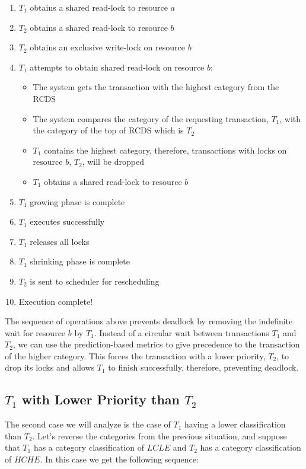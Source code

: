 \begin{enumerate}
  \item $T_{1}$ obtains a shared read-lock to resource $a$
  \item $T_{2}$ obtains a shared read-lock to resource $b$
  \item $T_{2}$ obtains an exclusive write-lock on resource $b$
  \item $T_{1}$ attempts to obtain shared read-lock on resource $b$:
    \begin{itemize}
        \item The system gets the transaction with the highest category from the RCDS
        \item The system compares the category of the requesting transaction, $T_{1}$, with the category of the top of RCDS which is $T_{2}$
        \item $T_{1}$ contains the highest category, therefore, transactions with locks on resource $b$, $T_{2}$, will be dropped
        \item $T_{1}$ obtains a shared read-lock to resource $b$
    \end{itemize}
  \item $T_{1}$ growing phase is complete
  \item $T_{1}$ executes successfully
  \item $T_{1}$ releases all locks
  \item $T_{1}$ shrinking phase is complete
  \item $T_{2}$ is sent to scheduler for rescheduling
  \item Execution complete!
\end{enumerate}

The sequence of operations above prevents deadlock by removing the indefinite wait for resource $b$ by $T_{1}$. Instead of a circular wait between transactions $T_{1}$ and $T_{2}$, we can use the prediction-based metrics to give precedence to the transaction of the higher category. This forces the transaction with a lower priority, $T_{2}$, to drop its locks and allows $T_{1}$ to finish successfully, therefore, preventing deadlock.

\subsection{\texorpdfstring{$T_{1}$ with Lower Priority than $T_{2}$}{}}
\label{sec:t1_lower_than_t2}
The second case we will analyze is the case of $T_{1}$ having a lower classification than $T_{2}$. Let's reverse the categories from the previous situation, and suppose that $T_{1}$ has a category classification of $LCLE$ and $T_{2}$ has a category classification of $HCHE$. In this case we get the following sequence:

